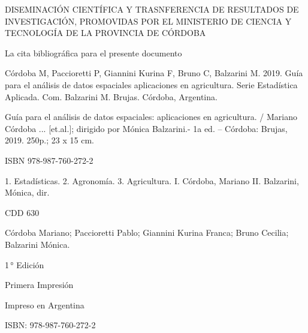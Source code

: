 

\begin{center}
	{DISEMINACIÓN CIENTÍFICA Y TRASNFERENCIA DE RESULTADOS DE INVESTIGACIÓN, PROMOVIDAS POR EL MINISTERIO DE CIENCIA Y TECNOLOGÍA DE LA PROVINCIA DE CÓRDOBA}
\end{center}

\medskip

La cita bibliográfica para el presente documento

Córdoba M, Paccioretti P, Giannini Kurina F, Bruno C, Balzarini M. 2019. Guía para el análisis de datos espaciales\: aplicaciones en agricultura. Serie Estadística Aplicada. Com. Balzarini M. Brujas. Córdoba, Argentina.

\bigskip

\begin{framed}
\smallskip
   {\scriptsize Guía para el análisis de datos espaciales: aplicaciones en agricultura. / Mariano Córdoba ... [et.al.]; dirigido por Mónica Balzarini.- 1a ed. – Córdoba: Brujas, 2019.  250p.; 23 x 15 cm.
    
   ISBN 978-987-760-272-2
            
 1. Estadísticas. 2. Agronomía. 3. Agricultura. I. Córdoba, Mariano II. Balzarini, Mónica, dir. 


   CDD 630}
   
\smallskip

\end{framed}

\medskip
\textcopyright    Córdoba Mariano; Paccioretti Pablo; Giannini Kurina Franca; Bruno Cecilia; Balzarini Mónica.

{ 

1\,° Edición 

Primera Impresión

Impreso en Argentina

ISBN: 978-987-760-272-2

}

